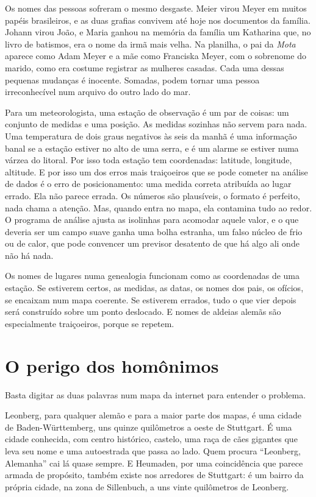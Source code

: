 \documentclass[
  brazilian,
  11pt,
  openany]{book}
\begin{document}
Os nomes das pessoas sofreram o mesmo desgaste. Meier virou Meyer em
muitos papéis brasileiros, e as duas grafias convivem até hoje nos
documentos da família. Johann virou João, e Maria ganhou na memória da
família um Katharina que, no livro de batismos, era o nome da irmã mais
velha. Na planilha, o pai da \emph{Mota} aparece como Adam Meyer e a mãe
como Franciska Meyer, com o sobrenome do marido, como era costume
registrar as mulheres casadas. Cada uma dessas pequenas mudanças é
inocente. Somadas, podem tornar uma pessoa irreconhecível num arquivo do
outro lado do mar.

Para um meteorologista, uma estação de observação é um par de coisas: um
conjunto de medidas e uma posição. As medidas sozinhas não servem para
nada. Uma temperatura de dois graus negativos às seis da manhã é uma
informação banal se a estação estiver no alto de uma serra, e é um
alarme se estiver numa várzea do litoral. Por isso toda estação tem
coordenadas: latitude, longitude, altitude. E por isso um dos erros mais
traiçoeiros que se pode cometer na análise de dados é o erro de
posicionamento: uma medida correta atribuída ao lugar errado. Ela não
parece errada. Os números são plausíveis, o formato é perfeito, nada
chama a atenção. Mas, quando entra no mapa, ela contamina tudo ao redor.
O programa de análise ajusta as isolinhas para acomodar aquele valor, e
o que deveria ser um campo suave ganha uma bolha estranha, um falso
núcleo de frio ou de calor, que pode convencer um previsor desatento de
que há algo ali onde não há nada.

Os nomes de lugares numa genealogia funcionam como as coordenadas de uma
estação. Se estiverem certos, as medidas, as datas, os nomes dos pais,
os ofícios, se encaixam num mapa coerente. Se estiverem errados, tudo o
que vier depois será construído sobre um ponto deslocado. E nomes de
aldeias alemãs são especialmente traiçoeiros, porque se repetem.

\section{O perigo dos homônimos}\label{o-perigo-dos-homuxf4nimos}

Basta digitar as duas palavras num mapa da internet para entender o
problema.

Leonberg, para qualquer alemão e para a maior parte dos mapas, é uma
cidade de Baden-Württemberg, uns quinze quilômetros a oeste de
Stuttgart. É uma cidade conhecida, com centro histórico, castelo, uma
raça de cães gigantes que leva seu nome e uma autoestrada que passa ao
lado. Quem procura ``Leonberg, Alemanha'' cai lá quase sempre. E
Heumaden, por uma coincidência que parece armada de propósito, também
existe nos arredores de Stuttgart: é um bairro da própria cidade, na
zona de Sillenbuch, a uns vinte quilômetros de Leonberg.
\end{document}

